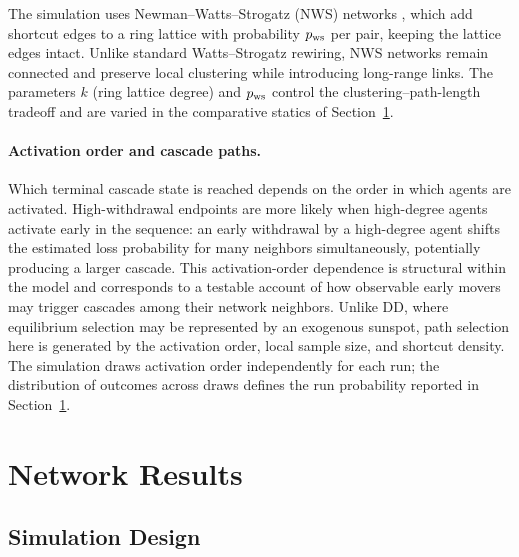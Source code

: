 \documentclass[12pt]{article}\usepackage[]{graphicx}\usepackage[]{xcolor}
\begin{document}
The simulation uses Newman--Watts--Strogatz (NWS) networks \citep{newman1999renormalization}, which add shortcut edges to a ring lattice with probability $p_{\rm ws}$ per pair, keeping the lattice edges intact.
Unlike standard Watts--Strogatz rewiring, NWS networks remain connected and preserve local clustering while introducing long-range links.
The parameters $k$ (ring lattice degree) and $p_{\rm ws}$ control the clustering--path-length tradeoff and are varied in the comparative statics of Section~\ref{sec:results}.

\paragraph{Activation order and cascade paths.}
Which terminal cascade state is reached depends on the order in which agents are activated.
High-withdrawal endpoints are more likely when high-degree agents activate early in the sequence: an early withdrawal by a high-degree agent shifts the estimated loss probability for many neighbors simultaneously, potentially producing a larger cascade.
This activation-order dependence is structural within the model and corresponds to a testable account of how observable early movers may trigger cascades among their network neighbors.
Unlike DD, where equilibrium selection may be represented by an exogenous sunspot, path selection here is generated by the activation order, local sample size, and shortcut density.
The simulation draws activation order independently for each run; the distribution of outcomes across draws defines the run probability reported in Section~\ref{sec:results}.

\section{Network Results}
\label{sec:results}

\subsection{Simulation Design}
\end{document}
